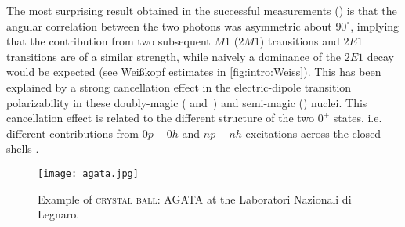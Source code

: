 The most surprising result obtained in the successful measurements (\cite{Schirmer-1984,Walker2020}) is that the angular correlation
between the two photons was asymmetric about $90^\circ$, implying that the contribution from two subsequent $M1$ ($2M1$) transitions and $2E1$ transitions are of a similar strength, while naively a dominance of the $2E1$ decay would be expected (see Weißkopf estimates in \cref{fig:intro:Weiss}).
This has been explained by a strong cancellation effect in the electric-dipole transition
polarizability in these doubly-magic ( and \,) and semi-magic () nuclei.
This cancellation effect is related to the different structure of the two $0^{+}$ states, i.e. different contributions from $0p-0h$ and $np-nh$ excitations across the closed shells \cite{Brown23}.

\begin{figure}[hbt]
    \centering
    \texttt{[image: agata.jpg]}
    \caption{Example of \textsc{crystal ball}: \textsc{AGATA} at the Laboratori Nazionali di Legnaro.}
    \label{fig:chap1:agata}
\end{figure}

